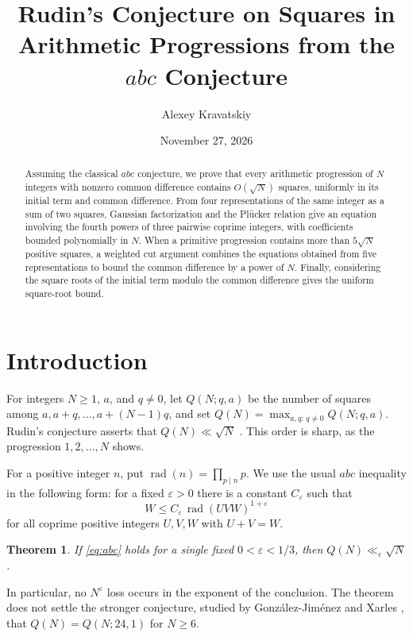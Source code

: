 \documentclass[11pt,reqno]{amsart}
\title[Rudin's conjecture from $abc$]
 {Rudin's Conjecture on Squares in Arithmetic Progressions from the $abc$ Conjecture}
\author{Alexey Kravatskiy}
\date{November 27, 2026}
\newtheorem{theorem}{Theorem}
\newcommand{\rad}{\operatorname{rad}}
\begin{document}
\begin{abstract}
Assuming the classical $abc$ conjecture, we prove that every arithmetic
progression of $N$ integers with nonzero common difference contains
$O(\sqrt N)$ squares, uniformly in its initial term and common difference.
From four representations of the same integer as a sum of two squares,
Gaussian factorization and the Pl\"ucker relation give an equation involving
the fourth powers of three pairwise coprime integers, with coefficients
bounded polynomially in $N$. When a primitive progression contains more
than $5\sqrt N$ positive squares, a weighted cut argument combines the
equations obtained from five representations to bound the common difference
by a power of $N$. Finally, considering the square roots of the initial term
modulo the common difference gives the uniform square-root bound.
\end{abstract}
\maketitle

\section{Introduction}

For integers $N\ge1$, $a$, and $q\ne0$, let $Q(N;q,a)$ be the number
of squares among $a,a+q,\ldots,a+(N-1)q$, and set
$Q(N)=\max_{a,q:\,q\ne0}Q(N;q,a)$.
Rudin's conjecture asserts that $Q(N)\ll\sqrt N$ \cite{Rudin,CG}.
This order is sharp, as the progression $1,2,\ldots,N$ shows.

For a positive integer $n$, put $\rad(n)=\prod_{p\mid n}p$.
We use the usual $abc$ inequality in the following form: for a fixed
$\varepsilon>0$ there is a constant $C_\varepsilon$ such that
\begin{equation}\label{eq:abc}
 W\le C_\varepsilon\,\rad(UVW)^{1+\varepsilon}
\end{equation}
for all coprime positive integers $U,V,W$ with $U+V=W$.

\begin{theorem}\label{thm:main}
If \eqref{eq:abc} holds for a single fixed $0<\varepsilon<1/3$, then
$Q(N)\ll_\varepsilon\sqrt N$.
\end{theorem}

In particular, no $N^\varepsilon$ loss occurs in the exponent of the
conclusion. The theorem does not settle the stronger conjecture, studied by
Gonz\'alez-Jim\'enez and Xarles \cite{GJX}, that $Q(N)=Q(N;24,1)$ for
$N\ge6$.
\end{document}
